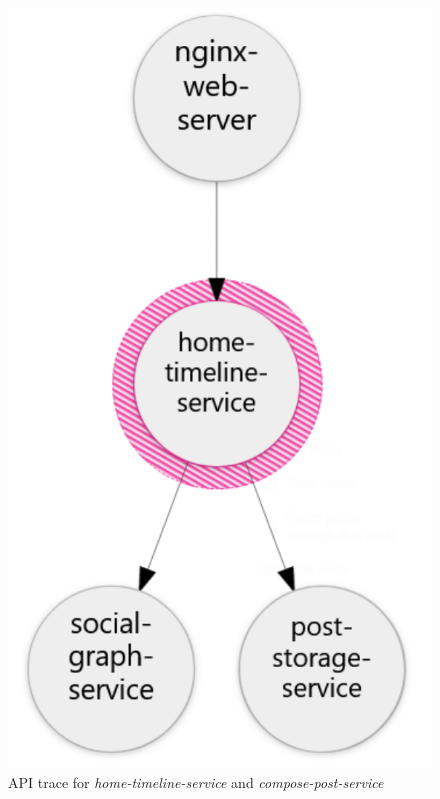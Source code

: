 \begin{figure}[htb]
    \centering
    \caption{API trace for \textit{home-timeline-service} and \textit{compose-post-service}}
    \label{fig:ht-cp-trace}
    \begin{minipage}{0.25\linewidth}
        \includegraphics[width=1.0\linewidth]{Figures/Home-Timeline-GET-Trace.pdf}
    \end{minipage}\hfill

\end{figure}
